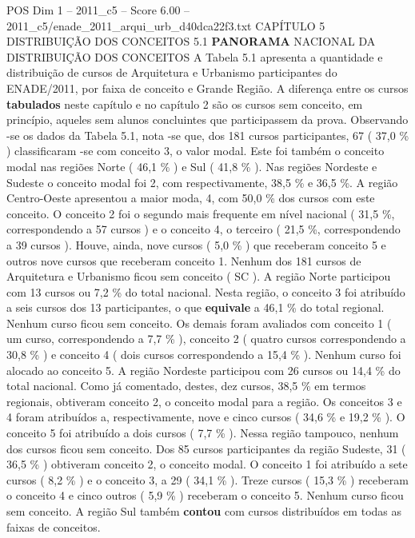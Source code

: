 \begin{textsample}{POS Dim 1 – 2011\_c5 – Score 6.00 – 2011\_c5/enade\_2011\_arqui\_urb\_d40dca22f3.txt}  \label{ex:f1_pos_124}
CAPÍTULO 5 DISTRIBUIÇÃO DOS CONCEITOS 5.1 \textbf{PANORAMA} NACIONAL DA DISTRIBUIÇÃO DOS CONCEITOS A Tabela 5.1 apresenta a quantidade e distribuição de cursos de Arquitetura e Urbanismo participantes do ENADE/2011, por faixa de conceito e Grande Região.
A diferença entre os cursos \textbf{tabulados} neste capítulo e no capítulo 2 são os cursos sem conceito, em princípio, aqueles sem alunos concluintes que participassem da prova.
Observando -se os dados da Tabela 5.1, nota -se que, dos 181 cursos participantes, 67 ( 37,0 \% ) classificaram -se com conceito 3, o valor modal.
Este foi também o conceito modal nas regiões Norte ( 46,1 \% ) e Sul ( 41,8 \% ).
Nas regiões Nordeste e Sudeste o conceito modal foi 2, com respectivamente, 38,5 \% e 36,5 \%.
A região Centro-Oeste apresentou a maior moda, 4, com 50,0 \% dos cursos com este conceito.
O conceito 2 foi o segundo mais frequente em nível nacional ( 31,5 \%, correspondendo a 57 cursos ) e o conceito 4, o terceiro ( 21,5 \%, correspondendo a 39 cursos ).
Houve, ainda, nove cursos ( 5,0 \% ) que receberam conceito 5 e outros nove cursos que receberam conceito 1.
Nenhum dos 181 cursos de Arquitetura e Urbanismo ficou sem conceito ( SC ).
A região Norte participou com 13 cursos ou 7,2 \% do total nacional.
Nesta região, o conceito 3 foi atribuído a seis cursos dos 13 participantes, o que \textbf{equivale} a 46,1 \% do total regional.
Nenhum curso ficou sem conceito.
Os demais foram avaliados com conceito 1 ( um curso, correspondendo a 7,7 \% ), conceito 2 ( quatro cursos correspondendo a 30,8 \% ) e conceito 4 ( dois cursos correspondendo a 15,4 \% ).
Nenhum curso foi alocado ao conceito 5.
A região Nordeste participou com 26 cursos ou 14,4 \% do total nacional.
Como já comentado, destes, dez cursos, 38,5 \% em termos regionais, obtiveram conceito 2, o conceito modal para a região.
Os conceitos 3 e 4 foram atribuídos a, respectivamente, nove e cinco cursos ( 34,6 \% e 19,2 \% ).
O conceito 5 foi atribuído a dois cursos ( 7,7 \% ).
Nessa região tampouco, nenhum dos cursos ficou sem conceito.
Dos 85 cursos participantes da região Sudeste, 31 ( 36,5 \% ) obtiveram conceito 2, o conceito modal.
O conceito 1 foi atribuído a sete cursos ( 8,2 \% ) e o conceito 3, a 29 ( 34,1 \% ).
Treze cursos ( 15,3 \% ) receberam o conceito 4 e cinco outros ( 5,9 \% ) receberam o conceito 5.
Nenhum curso ficou sem conceito.
A região Sul também \textbf{contou} com cursos distribuídos em todas as faixas de conceitos.

\end{textsample}
